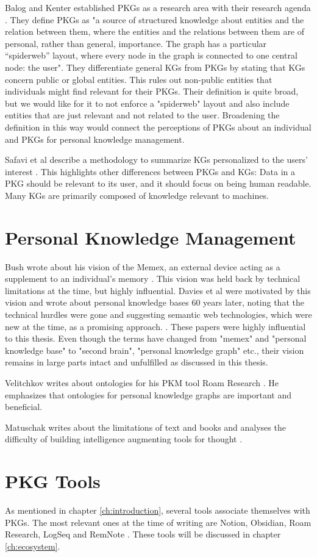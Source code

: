 Balog and Kenter established PKGs as a research area with their research agenda \cite{Balog2019PKGAgenda}. They define PKGs as "a source of structured knowledge about entities and the relation between them, where the entities and the relations between them are of personal, rather than general, importance. The graph has a particular “spiderweb” layout, where every node in the graph is connected to one central node: the user". They differentiate general KGs from PKGs by stating that KGs concern public or global entities. This rules out non-public entities that individuals might find relevant for their PKGs. Their definition is quite broad, but we would like for it to not enforce a "spiderweb" layout and also include entities that are just relevant and not related to the user. Broadening the definition in this way would connect the perceptions of PKGs about an individual and PKGs for personal knowledge management.

Safavi et al describe a methodology to summarize KGs personalized to the users' interest \cite{Safavi2019PKGSum}. This highlights other differences between PKGs and KGs: Data in a PKG should be relevant to its user, and it should focus on being human readable. Many KGs are primarily composed of knowledge relevant to machines.
    

\section{Personal Knowledge Management}
Bush wrote about his vision of the Memex, an external device acting as a  supplement to an individual's memory \cite{Bush1945Memex}. This vision was held back by technical limitations at the time, but highly influential. Davies et al were motivated by this vision and wrote about personal knowledge bases 60 years later, noting that the technical hurdles were gone and suggesting semantic web technologies, which were new at the time, as a promising approach. \cite{Davies2005Memex60}. These papers were highly influential to this thesis. Even though the terms have changed from "memex" and "personal knowledge base" to "second brain", "personal knowledge graph" etc., their vision remains in large parts intact and unfulfilled as discussed in this thesis.

Velitchkov writes about ontologies for his PKM tool Roam Research \cite{roamOntologies}. He emphasizes that ontologies for personal knowledge graphs are important and beneficial.

Matuschak writes about the limitations of text and books and analyses the difficulty of building intelligence augmenting tools for thought \cite{Matuschak2019TTFT}.

\section{PKG Tools}

As mentioned in chapter \ref{ch:introduction}, several tools associate themselves with PKGs. The most relevant ones at the time of writing are Notion, Obsidian, Roam Research, LogSeq and RemNote \cite{notion, roam, obsidian, logseq, remnote}. These tools will be discussed in chapter \ref{ch:ecosystem}.